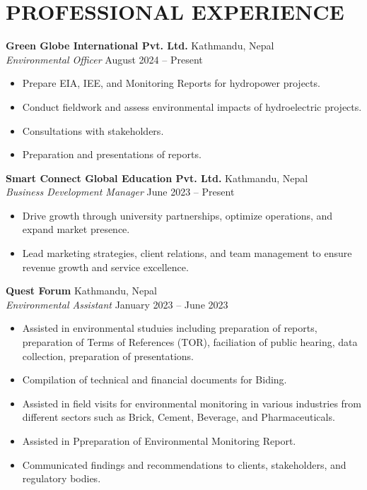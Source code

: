 \documentclass[a4paper,9pt]{extarticle}
\begin{document}
\section*{PROFESSIONAL EXPERIENCE}
\noindent
\textbf{Green Globe International Pvt. Ltd.} \hfill Kathmandu, Nepal\\ 
\textit{Environmental Officer} \hfill  August 2024 -- Present
\begin{itemize}
    \item Prepare EIA, IEE, and Monitoring Reports for hydropower projects.
    \item Conduct fieldwork and assess environmental impacts of hydroelectric projects.
    \item Consultations with stakeholders.
    \item Preparation and presentations of reports.
\end{itemize}

\noindent
\textbf{Smart Connect Global Education Pvt. Ltd.} \hfill Kathmandu, Nepal\\ 
\textit{Business Development Manager} \hfill June 2023 -- Present
\begin{itemize}
    \item Drive growth through university partnerships, optimize operations, and expand market presence.
    \item Lead marketing strategies, client relations, and team management to ensure revenue growth and service excellence.
\end{itemize}

\noindent
\textbf{Quest Forum} \hfill Kathmandu, Nepal\\ 
\textit{Environmental Assistant} \hfill January 2023 -- June 2023
\begin{itemize}
    \item Assisted in environmental studuies including preparation of reports, preparation of Terms of References (TOR), faciliation of public hearing, data collection, preparation of presentations.
    \item Compilation of technical and financial documents for Biding.
    \item Assisted in field visits for environmental monitoring in various industries from different sectors such as Brick, Cement, Beverage, and Pharmaceuticals.
    \item Assisted in Ppreparation of Environmental Monitoring Report.
    \item Communicated findings and recommendations to clients, stakeholders, and regulatory bodies.
\end{itemize}
\end{document}
